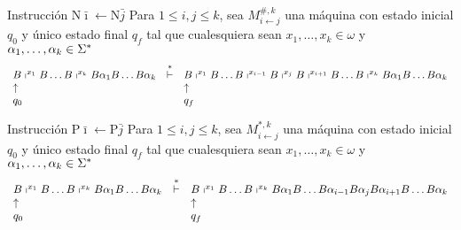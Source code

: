 \begin{frame}
  \begin{block}{Instrucción $\mathrm{N}\bar{\imath} \leftarrow \mathrm{N}\bar{j}$}
    \PN Para $1 \leq i,j \leq k$, sea $M_{i \leftarrow j}^{\#,k}$ una máquina con estado inicial $q_{0}$ y único estado
    final $q_{f}$ tal que cualesquiera sean $x_{1}, \dotsc, x_{k} \in \omega$ y $\alpha_{1}, \dotsc, \alpha_{k} \in
    \Sigma^{\ast}$
    \sizeOfLetterFirst
    \[
      \begin{array}{lcl}
        B \shortmid^{x_{1}} B \dotsc B \shortmid^{x_{k}} B \alpha_{1} B \dotsc B \alpha_{k} &\overset{\ast}{\vdash}& B
          \shortmid^{x_{1}} B \dotsc B \shortmid^{x_{i-1}} B \shortmid^{x_{j}} B \shortmid^{x_{i+1}} B \dotsc B
          \shortmid^{x_{k}} B \alpha_{1} B \dotsc B \alpha_{k} \\
        \uparrow && \uparrow \\
        q_{0} & & q_{f}
      \end{array}
    \]
  \end{block}

  \begin{block}{Instrucción $\mathrm{P}\bar{\imath} \leftarrow \mathrm{P}\bar{j}$}
    \PN Para $1 \leq i,j \leq k$, sea $M_{i \leftarrow j}^{\ast,k}$ una máquina con estado inicial $q_{0}$ y único
    estado final $q_{f}$ tal que cualesquiera sean $x_{1}, \dotsc, x_{k} \in \omega$ y $\alpha_{1}, \dotsc, \alpha_{k}
    \in \Sigma^{\ast}$
    \sizeOfLetterFirst
    \[
      \begin{array}{lcl}
        B \shortmid^{x_{1}} B \dotsc B \shortmid^{x_{k}} B \alpha_{1} B \dotsc B \alpha_{k} &\overset{\ast}{\vdash}& B
          \shortmid^{x_{1}} B \dotsc B \shortmid^{x_{k}} B \alpha_{1} B \dotsc B \alpha_{i-1} B \alpha_{j} B
          \alpha_{i+1} B \dotsc B \alpha_{k} \\
        \uparrow && \uparrow \\
        q_{0} & & q_{f}
      \end{array}
    \]
  \end{block}
\end{frame}
